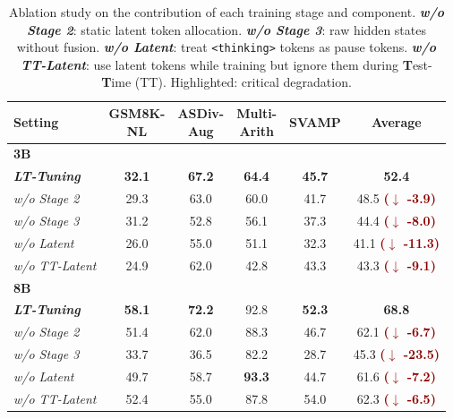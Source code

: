 \documentclass{article}
\newcommand{\decrease}[1]{\textcolor{darkred}{\textbf{($\downarrow$ -#1)}}}
\theoremstyle{plain}
\theoremstyle{definition}
\theoremstyle{remark}
\begin{document}
\begin{table}[ht]
\centering
\begin{adjustbox}{width=0.48\textwidth}
\renewcommand{\arraystretch}{1.15}
\begin{tabular}{l ccccc}
\toprule
\bf Setting & \bf \makecell{GSM8K-\\NL} & \bf \makecell{ASDiv-\\Aug} & \bf \makecell{Multi-\\Arith} & \bf SVAMP & \bf Average \\ 
\midrule
\multicolumn{6}{l}{\textbf{3B}} \\
\midrule
\textit{\textbf{LT-Tuning}}             & \textbf{32.1} & \textbf{67.2} & \textbf{64.4} & \textbf{45.7} & \textbf{52.4} \\
\quad \textit{w/o Stage 2}              & 29.3 & 63.0 & 60.0 & 41.7 & 48.5 \decrease{3.9} \\
\quad \textit{w/o Stage 3}              & 31.2 & 52.8 & 56.1 & 37.3 & 44.4 \decrease{8.0} \\
\cellcolor{red!15}\quad \textit{w/o Latent} & \cellcolor{red!15}26.0 & \cellcolor{red!15}55.0 & \cellcolor{red!15}51.1 & \cellcolor{red!15}32.3 & \cellcolor{red!15}41.1 \decrease{11.3} \\
\quad \textit{w/o TT-Latent}   & 24.9 & 62.0 & 42.8 & 43.3 & 43.3 \decrease{9.1} \\
\midrule
\multicolumn{6}{l}{\textbf{8B}} \\
\midrule
\textit{\textbf{LT-Tuning}}             & \textbf{58.1} & \textbf{72.2} & 92.8 & \textbf{52.3} & \textbf{68.8} \\
\quad \textit{w/o Stage 2}              & 51.4 & 62.0 & 88.3 & 46.7 & 62.1 \decrease{6.7} \\
\cellcolor{red!15}\quad \textit{w/o Stage 3} & \cellcolor{red!15}33.7 & \cellcolor{red!15}36.5 & \cellcolor{red!15}82.2 & \cellcolor{red!15}28.7 & \cellcolor{red!15}45.3 \decrease{23.5} \\
\quad \textit{w/o Latent}               & 49.7 & 58.7 & \textbf{93.3} & 44.7 & 61.6 \decrease{7.2} \\
\quad \textit{w/o TT-Latent}   & 52.4 & 55.0 & 87.8 & 54.0 & 62.3 \decrease{6.5} \\
\bottomrule
\end{tabular}
\end{adjustbox}
\caption{
Ablation study on the contribution of each training stage and component. \textbf{\textit{w/o Stage 2}}: static latent token allocation. \textbf{\textit{w/o Stage 3}}: raw hidden states without fusion. \textbf{\textit{w/o Latent}}: treat \texttt{<thinking>} tokens as pause tokens. \textbf{\textit{w/o TT-Latent}}: use latent tokens while training but ignore them during \textbf{T}est-\textbf{T}ime (TT). \colorbox{red!15}{Highlighted}: critical degradation.
}
\label{table:ablation}
\end{table}
\end{document}

